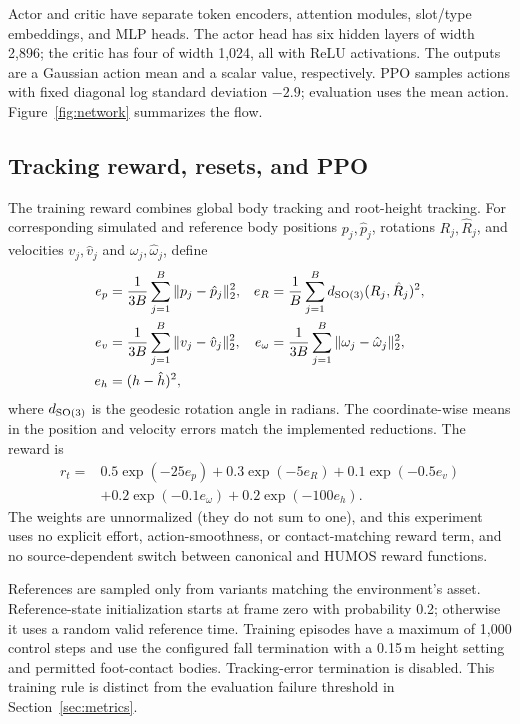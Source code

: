 Actor and critic have separate token encoders, attention modules, slot/type
embeddings, and MLP heads. The actor head has six hidden layers of width
2,896; the critic has four of width 1,024, all with ReLU activations.
The outputs are a Gaussian action mean and a scalar value, respectively.
PPO samples actions with fixed diagonal log standard deviation $-2.9$;
evaluation uses the mean action. Figure~\ref{fig:network} summarizes the flow.

\subsection{Tracking reward, resets, and PPO}\label{sec:learning}

The training reward combines global body tracking and root-height tracking.
For corresponding simulated and reference body positions $p_j,\hat{p}_j$,
rotations $R_j,\hat{R}_j$, and velocities $v_j,\hat{v}_j$ and
$\omega_j,\hat{\omega}_j$, define
\begin{align}
    e_p &= \frac{1}{3B}\sum_{j=1}^{B}\|p_j-\hat{p}_j\|_2^2,
    & e_R &= \frac{1}{B}\sum_{j=1}^{B}
                  d_{\mathrm{SO}(3)}(R_j,\hat{R}_j)^2, \\
    e_v &= \frac{1}{3B}\sum_{j=1}^{B}\|v_j-\hat{v}_j\|_2^2,
    & e_\omega &= \frac{1}{3B}\sum_{j=1}^{B}
                     \|\omega_j-\hat{\omega}_j\|_2^2, \\
    e_h &= (h-\hat{h})^2, &&
\end{align}
where $d_{\mathrm{SO}(3)}$ is the geodesic rotation angle in radians.
The coordinate-wise means in the position and velocity errors match the
implemented reductions. The reward is
\begin{equation}
\begin{split}
    r_t ={}& 0.5\exp(-25e_p) + 0.3\exp(-5e_R)
             + 0.1\exp(-0.5e_v)\\
           &+0.2\exp(-0.1e_\omega) + 0.2\exp(-100e_h).
\end{split}\label{eq:reward}
\end{equation}
The weights are unnormalized (they do not sum to one), and this experiment
uses no explicit effort, action-smoothness, or contact-matching reward term,
and no source-dependent switch between canonical and HUMOS reward functions.

References are sampled only from variants matching the environment's asset.
Reference-state initialization starts at frame zero with probability 0.2;
otherwise it uses a random valid reference time. Training episodes have a
maximum of 1,000 control steps and use the configured fall termination with
a 0.15\,m height setting and permitted foot-contact bodies. Tracking-error
termination is disabled. This training rule is distinct from the evaluation
failure threshold in Section~\ref{sec:metrics}.

